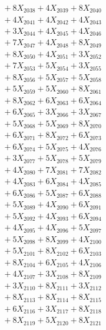 \documentclass[a4paper,10pt]{article}
\begin{document}
{\begin{align}
&\;  + 8 X_{2038} + 4 X_{2039} + 8 X_{2040} \\[0.3ex]
&\;  + 4 X_{2041} + 4 X_{2042} + 4 X_{2043} \\[0.3ex]
&\;  + 3 X_{2044} + 4 X_{2045} + 4 X_{2046} \\[0.3ex]
&\;  + 7 X_{2047} + 4 X_{2048} + 8 X_{2049} \\[0.5ex]\allowbreak
&\;  + 8 X_{2050} + 4 X_{2051} + 3 X_{2052} \\[0.3ex]
&\;  + 7 X_{2053} + 5 X_{2054} + 3 X_{2055} \\[0.3ex]
&\;  + 8 X_{2056} + 5 X_{2057} + 5 X_{2058} \\[0.3ex]
&\;  + 5 X_{2059} + 5 X_{2060} + 8 X_{2061} \\[0.3ex]
&\;  + 8 X_{2062} + 6 X_{2063} + 6 X_{2064} \\[0.3ex]
&\;  + 6 X_{2065} + 3 X_{2066} + 3 X_{2067} \\[0.3ex]
&\;  + 5 X_{2068} + 5 X_{2069} + 8 X_{2070} \\[0.3ex]
&\;  + 6 X_{2071} + 8 X_{2072} + 6 X_{2073} \\[0.3ex]
&\;  + 6 X_{2074} + 5 X_{2075} + 4 X_{2076} \\[0.3ex]
&\;  + 3 X_{2077} + 5 X_{2078} + 5 X_{2079} \\[0.5ex]\allowbreak
&\;  + 4 X_{2080} + 7 X_{2081} + 7 X_{2082} \\[0.3ex]
&\;  + 4 X_{2083} + 6 X_{2084} + 4 X_{2085} \\[0.3ex]
&\;  + 6 X_{2086} + 5 X_{2087} + 6 X_{2088} \\[0.3ex]
&\;  + 5 X_{2089} + 4 X_{2090} + 6 X_{2091} \\[0.3ex]
&\;  + 5 X_{2092} + 4 X_{2093} + 6 X_{2094} \\[0.3ex]
&\;  + 4 X_{2095} + 4 X_{2096} + 5 X_{2097} \\[0.3ex]
&\;  + 5 X_{2098} + 8 X_{2099} + 4 X_{2100} \\[0.3ex]
&\;  + 5 X_{2101} + 8 X_{2102} + 6 X_{2103} \\[0.3ex]
&\;  + 8 X_{2104} + 6 X_{2105} + 4 X_{2106} \\[0.3ex]
&\;  + 4 X_{2107} + 3 X_{2108} + 8 X_{2109} \\[0.5ex]\allowbreak
&\;  + 3 X_{2110} + 8 X_{2111} + 3 X_{2112} \\[0.3ex]
&\;  + 8 X_{2113} + 8 X_{2114} + 8 X_{2115} \\[0.3ex]
&\;  + 6 X_{2116} + 3 X_{2117} + 8 X_{2118} \\[0.3ex]
&\;  + 8 X_{2119} + 5 X_{2120} + 8 X_{2121} \\[0.3ex]

\end{align}}
\end{document}
